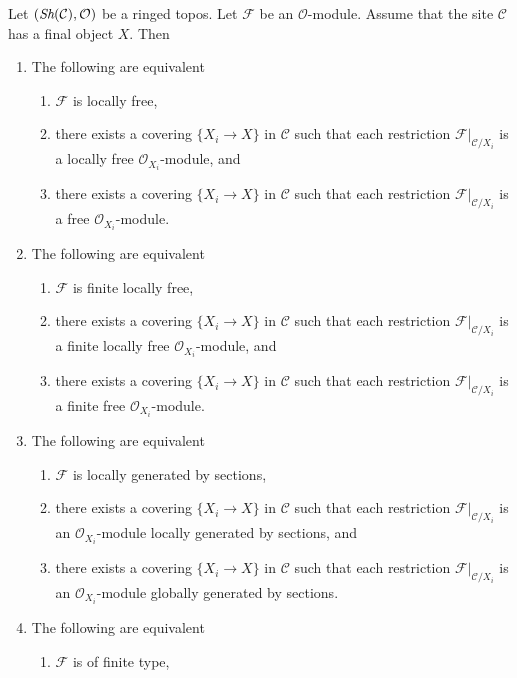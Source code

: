 \begin{lemma}
\label{lemma-local-final-object}
Let $(\mathop{\textit{Sh}}\nolimits(\mathcal{C}), \mathcal{O})$
be a ringed topos. Let $\mathcal{F}$ be an $\mathcal{O}$-module.
Assume that the site $\mathcal{C}$ has a final object $X$.
Then
\begin{enumerate}
\item The following are equivalent
\begin{enumerate}
\item $\mathcal{F}$ is locally free,
\item there exists a covering $\{X_i \to X\}$ in $\mathcal{C}$ such that
each restriction $\mathcal{F}|_{\mathcal{C}/X_i}$ is a locally free
$\mathcal{O}_{X_i}$-module, and
\item there exists a covering $\{X_i \to X\}$ in $\mathcal{C}$ such that
each restriction $\mathcal{F}|_{\mathcal{C}/X_i}$ is a free
$\mathcal{O}_{X_i}$-module.
\end{enumerate}
\item The following are equivalent
\begin{enumerate}
\item $\mathcal{F}$ is finite locally free,
\item there exists a covering $\{X_i \to X\}$ in $\mathcal{C}$
such that each restriction $\mathcal{F}|_{\mathcal{C}/X_i}$
is a finite locally free $\mathcal{O}_{X_i}$-module, and
\item there exists a covering $\{X_i \to X\}$ in $\mathcal{C}$
such that each restriction $\mathcal{F}|_{\mathcal{C}/X_i}$
is a finite free $\mathcal{O}_{X_i}$-module.
\end{enumerate}
\item The following are equivalent
\begin{enumerate}
\item $\mathcal{F}$ is locally generated by sections,
\item there exists a covering $\{X_i \to X\}$ in $\mathcal{C}$
such that each restriction $\mathcal{F}|_{\mathcal{C}/X_i}$
is an $\mathcal{O}_{X_i}$-module locally generated by sections, and
\item there exists a covering $\{X_i \to X\}$ in $\mathcal{C}$
such that each restriction $\mathcal{F}|_{\mathcal{C}/X_i}$
is an $\mathcal{O}_{X_i}$-module globally generated by sections.
\end{enumerate}
\item The following are equivalent
\begin{enumerate}
\item $\mathcal{F}$ is of finite type,

\end{enumerate}
\end{enumerate}
\end{lemma}
